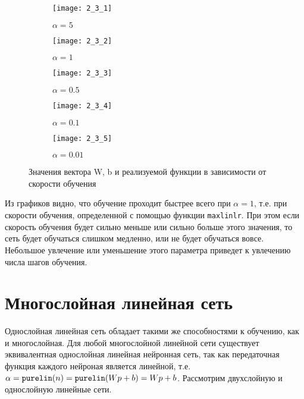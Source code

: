 \begin{figure}[H]
\begin{center}
	\begin{subfigure}[b]{0.49\textwidth}
		\texttt{[image: 2\_3\_1]}
		\caption{$\alpha = 5$}
	\end{subfigure}
	\begin{subfigure}[b]{0.49\textwidth}
		\texttt{[image: 2\_3\_2]}
		\caption{$\alpha = 1$}
	\end{subfigure}
	\begin{subfigure}[b]{0.49\textwidth}
		\texttt{[image: 2\_3\_3]}
		\caption{$\alpha = 0.5$}
	\end{subfigure}
	\begin{subfigure}[b]{0.49\textwidth}
		\texttt{[image: 2\_3\_4]}
		\caption{$\alpha = 0.1$}
	\end{subfigure}
	\begin{subfigure}[b]{0.49\textwidth}
		\texttt{[image: 2\_3\_5]}
		\caption{$\alpha = 0.01$}
	\end{subfigure}
	\caption{Значения вектора W, b и реализуемой функции в зависимости от скорости обучения}
	\label{fig:2_3}
\end{center}
\end{figure}

Из графиков видно, что обучение проходит быстрее всего при $\alpha = 1$, т.е. при скорости обучения, определенной с помощью функции \verb+maxlinlr+. При этом если скорость обучения будет сильно меньше или сильно больше этого значения, то сеть будет обучаться слишком медленно, или не будет обучаться вовсе. Небольшое увлечение или уменьшение этого параметра приведет к увлечению числа шагов обучения.

\section{Многослойная линейная сеть}


Однослойная линейная сеть обладает такими же способностями к обучению, как и многослойная. Для любой многослойной линейной сети существует эквивалентная однослойная линейная нейронная сеть, так как передаточная функция каждого нейроная является линейной, т.е. $\alpha = \verb+purelin+(n) = \verb+purelin+(Wp+b) = Wp+b$. Рассмотрим двухслойную и однослойную линейные сети.

